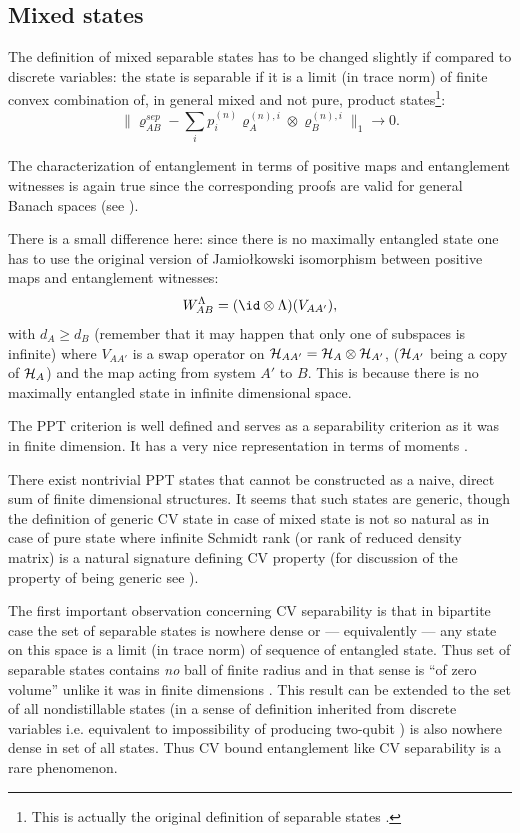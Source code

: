 \documentclass[rmp,12pt,preprint]{revtex4-2}
\begin{document}
\subsection{Mixed states}

The definition of mixed separable states has to be changed slightly if
compared to discrete variables: the state is separable if it is a
limit (in trace norm) of finite convex combination of, in general
mixed and not pure, product states\footnote{This is actually the
  original definition of separable states \cite{Werner1989}.}:
\begin{equation}
\|\varrho^{sep}_{AB} - \sum_{i}p_{i}^{(n)} \varrho^{(n),i}_{A}
\otimes \varrho^{(n),i}_{B}\|_1 \rightarrow 0.
\end{equation}

The characterization of entanglement in terms of positive maps and
entanglement witnesses is again true since the corresponding proofs
are valid for general Banach spaces (see \cite{sep1996}).

There is a small difference here: since there is no maximally
entangled state one has to use the original version of Jamio\l{}kowski
isomorphism between positive maps and entanglement witnesses:
\begin{equation}
W^{\Lambda}_{AB}=(\id \otimes \Lambda)(V_{AA'}),
\end{equation}
with $d_{A}\geq d_{B}$ (remember that it may happen that only one of
subspaces is infinite) where $V_{AA'}$ is a swap operator on ${\cal
  H}_{AA'}={\cal H}_{A}\otimes {\cal H}_{A'}$, (${\cal H}_{A'}$ being
a copy of ${\cal H}_{A}$) and the map acting from system $A'$ to $B$.
This is because there is no maximally entangled state in infinite
dimensional space.

The PPT criterion is well defined and serves as a separability
criterion as it was in finite dimension. It has a very nice
representation in terms of moments \cite{SV}.

There exist nontrivial PPT states \cite{boundCV} that cannot be
constructed as a naive, direct sum of finite dimensional structures.
It seems that such states are generic, though the definition of
generic CV state in case of mixed state is not so natural as in case
of pure state where infinite Schmidt rank (or rank of reduced density
matrix) is a natural signature defining CV property (for discussion of
the property of being generic see \cite{BoundCon}).

The first important observation concerning CV separability is
\cite{CliftonHalvorson02} that in bipartite case the set of separable
states is nowhere dense or --- equivalently --- any state on this
space is a limit (in trace norm) of sequence of entangled state.  Thus
set of separable states contains {\it no} ball of finite radius and in
that sense is ``of zero volume'' unlike it was in finite dimensions
\cite{ZyczkowskiHSP-vol}.  This result can be extended \cite{BoundCon}
to the set of all nondistillable states (in a sense of definition
inherited from discrete variables i.e. equivalent to impossibility of
producing two-qubit \singlets) is also nowhere dense in set of all
states.  Thus CV bound entanglement like CV separability is a rare
phenomenon.
\end{document}
